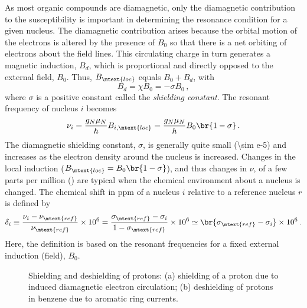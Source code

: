 As most organic compounds are diamagnetic, only the diamagnetic contribution to the susceptibility is important in determining the resonance condition for a given nucleus. 
The diamagnetic contribution arises because the orbital motion of the electrons is altered by the presence of \( B_0 \) so that there is a net orbiting of electrons about the field lines. 
This circulating charge in turn generates a magnetic induction, \( B_d \), which is proportional and directly opposed to the external field, \( B_0 \). 
Thus, \( B_\mtext{loc} \) equals \( B_0 + B_d \), with
\begin{equation}
	B_d = \chi B_0 = -\sigma B_0 \, ,
	\label{eq:B_dia}
\end{equation}
where \( \sigma \) is a positive constant called the \emph{shielding constant}. 
The resonant frequency of nucleus \( i \) becomes 
\begin{equation}
	\nu_i = \frac{g_N \mu_N}{h} B_{i, \mtext{loc}} = \frac{g_N \mu_N}{h} B_0 \br{1 - \sigma} \, .
	\label{eq:chem_shift}
\end{equation} 
The diamagnetic shielding constant, \( \sigma \), is generally quite small (\num{\sim e-5}) and increases as the electron density around the nucleus is increased. 
Changes in the local induction (\( B_\mtext{loc} = B_0 \br{1 - \sigma} \)), and thus changes in \( \nu \), of a few parts per million (\si{\ppm}) are typical when the chemical environment about a nucleus is changed. 
The chemical shift in \si{ppm} of a nucleus \( i \) relative to a reference nucleus \( r \) is defined by 
\begin{equation}
	\delta_{i} \equiv 
		\frac{\nu_{i}-\nu_\mtext{ref}}{\nu_\mtext{ref}} \times 10^6 = 
		\frac{\sigma_\mtext{ref} - \sigma_i}{1 - \sigma_\mtext{ref}} \times 10^6 \simeq 
		\br{\sigma_\mtext{ref} - \sigma_i} \times 10^6 \, .
		\label{eq:chem_shift_delta}
\end{equation}
Here, the definition is based on the resonant frequencies for a fixed external induction (field), \( B_0 \). 

\begin{figure}[htb]
  \centering
  
  \caption{Shielding and deshielding of protons: (a) shielding of a proton due to induced diamagnetic electron circulation; (b) deshielding of protons in benzene due to aromatic ring currents.}
  \label{fig:shielding}
\end{figure}
  

